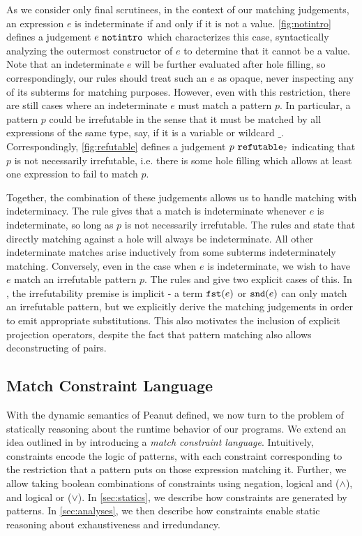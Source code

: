 


\pagebreak

As we consider only final scrutinees, in the context of our matching judgements, an expression $e$ is indeterminate if and only if it is not a value. \autoref{fig:notintro} defines a judgement $e ~\mathtt{notintro}$ which characterizes this case, syntactically analyzing the outermost constructor of $e$ to determine that it cannot be a value. Note that an indeterminate $e$ will be further evaluated after hole filling, so correspondingly, our rules should treat such an $e$ as opaque, never inspecting any of its subterms for matching purposes. However, even with this restriction, there are still cases where an indeterminate $e$ must match a pattern $p$. In particular, a pattern $p$ could be irrefutable in the sense that it must be matched by all expressions of the same type, say, if it is a variable  or wildcard $\_$. Correspondingly, \autoref{fig:refutable} defines a judgement $p ~\mathtt{refutable}_?$ indicating that $p$ is not necessarily irrefutable, i.e. there is some hole filling which allows at least one expression to fail to match $p$.

Together, the combination of these judgements allows us to handle matching with indeterminacy. The rule \MMNotIntro gives that a match is indeterminate whenever $e$ is indeterminate, so long as $p$ is not necessarily irrefutable. The rules \MMEHole and \MMHole state that directly matching against a hole will always be indeterminate. All other indeterminate matches arise inductively from some subterms indeterminately matching. Conversely, even in the case when $e$ is indeterminate, we wish to have $e$ match an irrefutable pattern $p$. The rules \MVar and \MWild give two explicit cases of this. In \MNotIntroPair, the irrefutability premise is implicit - a term $\mathtt{fst}(e)$ or $\mathtt{snd}(e)$ can only match an irrefutable pattern, but we explicitly derive the matching judgements in order to emit appropriate substitutions. This also motivates the inclusion of explicit projection operators, despite the fact that pattern matching also allows deconstructing of pairs.

\subsection{Match Constraint Language}\label{sec:constraints}
With the dynamic semantics of Peanut defined, we now turn to the problem of statically reasoning about the runtime behavior of our programs. We extend an idea outlined in \cite{Harper2012} by introducing a \emph{match constraint language}. Intuitively, constraints encode the logic of patterns, with each constraint corresponding to the restriction that a pattern puts on those expression matching it. Further, we allow taking boolean combinations of constraints using negation, logical and ($\land$), and logical or ($\lor$). In \autoref{sec:statics}, we describe how constraints are generated by patterns. In \autoref{sec:analyses}, we then describe how constraints enable static reasoning about exhaustiveness and irredundancy.


